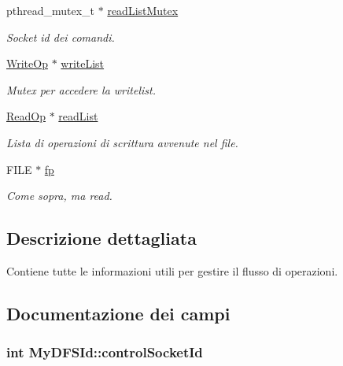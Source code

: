 \begin{DoxyCompactItemize}
pthread\+\_\+mutex\+\_\+t $\ast$ \hyperlink{structMyDFSId_a71f51c82d7133bfc16fcffeb4c395da0}{read\+List\+Mutex}
\begin{DoxyCompactList}\small\item\em Socket id dei comandi. \end{DoxyCompactList}\item 
\hyperlink{structWriteOp}{Write\+Op} $\ast$ \hyperlink{structMyDFSId_a0f7d2a9c60ddc649ee7e65b8b9295432}{write\+List}
\begin{DoxyCompactList}\small\item\em Mutex per accedere la writelist. \end{DoxyCompactList}\item 
\hyperlink{structReadOp}{Read\+Op} $\ast$ \hyperlink{structMyDFSId_a8a4360512d45c22b6d8e980967c7dd32}{read\+List}
\begin{DoxyCompactList}\small\item\em Lista di operazioni di scrittura avvenute nel file. \end{DoxyCompactList}\item 
F\+I\+LE $\ast$ \hyperlink{structMyDFSId_ae2badd91d3b506420a9e49554df8212d}{fp}
\begin{DoxyCompactList}\small\item\em Come sopra, ma read. \end{DoxyCompactList}\end{DoxyCompactItemize}


\subsection{Descrizione dettagliata}
Contiene tutte le informazioni utili per gestire il flusso di operazioni. 

\subsection{Documentazione dei campi}
\subsubsection[{\texorpdfstring{control\+Socket\+Id}{controlSocketId}}]{\setlength{\rightskip}{0pt plus 5cm}int My\+D\+F\+S\+Id\+::control\+Socket\+Id}\hypertarget{structMyDFSId_a4b67c0973fca25c75395e001b0bf8fc7}{}\label{structMyDFSId_a4b67c0973fca25c75395e001b0bf8fc7}


